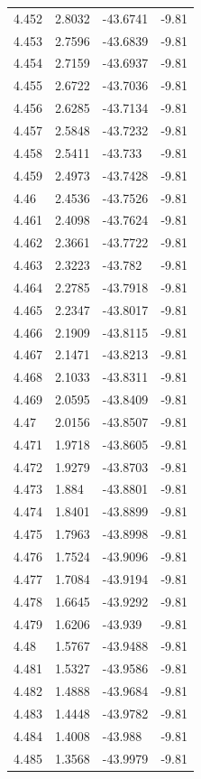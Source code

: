 \begin{tabular}{llll}
4.452 & 2.8032 & -43.6741 & -9.81 \\
4.453 & 2.7596 & -43.6839 & -9.81 \\
4.454 & 2.7159 & -43.6937 & -9.81 \\
4.455 & 2.6722 & -43.7036 & -9.81 \\
4.456 & 2.6285 & -43.7134 & -9.81 \\
4.457 & 2.5848 & -43.7232 & -9.81 \\
4.458 & 2.5411 & -43.733 & -9.81 \\
4.459 & 2.4973 & -43.7428 & -9.81 \\
4.46 & 2.4536 & -43.7526 & -9.81 \\
4.461 & 2.4098 & -43.7624 & -9.81 \\
4.462 & 2.3661 & -43.7722 & -9.81 \\
4.463 & 2.3223 & -43.782 & -9.81 \\
4.464 & 2.2785 & -43.7918 & -9.81 \\
4.465 & 2.2347 & -43.8017 & -9.81 \\
4.466 & 2.1909 & -43.8115 & -9.81 \\
4.467 & 2.1471 & -43.8213 & -9.81 \\
4.468 & 2.1033 & -43.8311 & -9.81 \\
4.469 & 2.0595 & -43.8409 & -9.81 \\
4.47 & 2.0156 & -43.8507 & -9.81 \\
4.471 & 1.9718 & -43.8605 & -9.81 \\
4.472 & 1.9279 & -43.8703 & -9.81 \\
4.473 & 1.884 & -43.8801 & -9.81 \\
4.474 & 1.8401 & -43.8899 & -9.81 \\
4.475 & 1.7963 & -43.8998 & -9.81 \\
4.476 & 1.7524 & -43.9096 & -9.81 \\
4.477 & 1.7084 & -43.9194 & -9.81 \\
4.478 & 1.6645 & -43.9292 & -9.81 \\
4.479 & 1.6206 & -43.939 & -9.81 \\
4.48 & 1.5767 & -43.9488 & -9.81 \\
4.481 & 1.5327 & -43.9586 & -9.81 \\
4.482 & 1.4888 & -43.9684 & -9.81 \\
4.483 & 1.4448 & -43.9782 & -9.81 \\
4.484 & 1.4008 & -43.988 & -9.81 \\
4.485 & 1.3568 & -43.9979 & -9.81 \\

\end{tabular}
